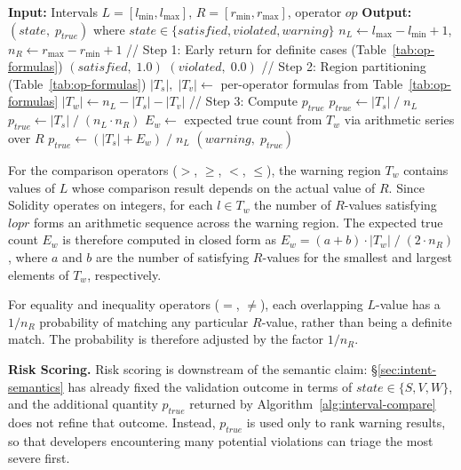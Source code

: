 \documentclass[pdflatex,sn-basic]{sn-jnl}%
\theoremstyle{thmstyleone}%
\theoremstyle{thmstyletwo}%
\theoremstyle{thmstylethree}%
\begin{document}
\begin{algorithm}[t]
\caption{Interval Comparison}
\label{alg:interval-compare}
\begin{algorithmic}[1]
\State \textbf{Input:} Intervals $L = [l_{\min}, l_{\max}]$, $R = [r_{\min}, r_{\max}]$, operator $op$
\State \textbf{Output:} $(\mathit{state},\; p_{\mathit{true}})$ where $\mathit{state} \in \{\mathit{satisfied}, \mathit{violated}, \mathit{warning}\}$
\State $n_L \gets l_{\max} - l_{\min} + 1$, \; $n_R \gets r_{\max} - r_{\min} + 1$
\Statex
\Statex // Step 1: Early return for definite cases (Table~\ref{tab:op-formulas})
    \State \Return $(satisfied,\; 1.0)$
    \State \Return $(violated,\; 0.0)$
\EndIf
\Statex
\Statex // Step 2: Region partitioning (Table~\ref{tab:op-formulas})
\State $|T_s|,\; |T_v| \gets$ per-operator formulas from Table~\ref{tab:op-formulas}
\State $|T_w| \gets n_L - |T_s| - |T_v|$
\Statex
\Statex // Step 3: Compute $p_{\mathit{true}}$
    \State $p_{\mathit{true}} \gets |T_s| \;/\; n_L$
    \State $p_{\mathit{true}} \gets |T_s| \;/\; (n_L \cdot n_R)$ 
\Else \Comment{$>,\; \geq,\; <,\; \leq$}
    \State $E_w \gets$ expected true count from $T_w$ via arithmetic series over $R$
    \State $p_{\mathit{true}} \gets (|T_s| + E_w) \;/\; n_L$
\EndIf
\State \Return $(warning,\; p_{\mathit{true}})$
\end{algorithmic}
\end{algorithm}

For the comparison operators ($>$, $\geq$, $<$, $\leq$), the warning region $T_w$ contains values of $L$ whose comparison result depends on the actual value of $R$.
Since Solidity operates on integers, for each $l \in T_w$ the number of $R$-values satisfying $l \mathrel{op} r$ forms an arithmetic sequence across the warning region.
The expected true count $E_w$ is therefore computed in closed form as $E_w = (a + b) \cdot |T_w| \;/\; (2 \cdot n_R)$, where $a$ and $b$ are the number of satisfying $R$-values for the smallest and largest elements of $T_w$, respectively.

For equality and inequality operators ($=$, $\neq$), each overlapping $L$-value has a $1/n_R$ probability of matching any particular $R$-value, rather than being a definite match.
The probability is therefore adjusted by the factor $1/n_R$.

\smallskip
\noindent\textbf{Risk Scoring.}
Risk scoring is downstream of the semantic claim: §\ref{sec:intent-semantics} has already fixed the validation outcome in terms of $\mathit{state} \in \{S, V, W\}$, and the additional quantity $p_{\mathit{true}}$ returned by Algorithm~\ref{alg:interval-compare} does not refine that outcome.
Instead, $p_{\mathit{true}}$ is used only to rank warning results, so that developers encountering many potential violations can triage the most severe first.
\end{document}
